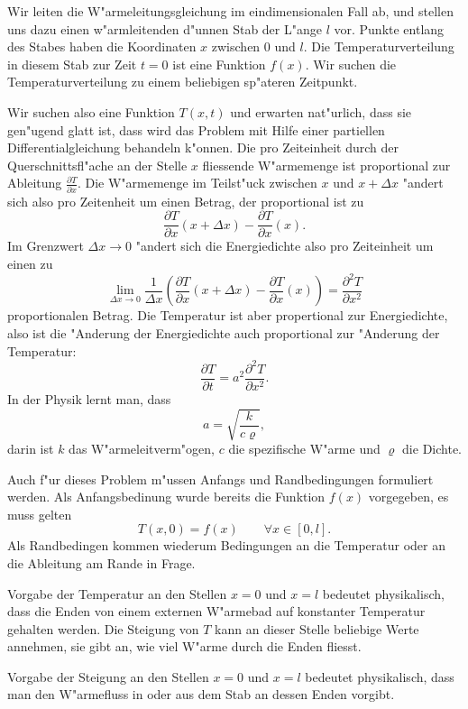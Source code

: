 Wir leiten die W"armeleitungsgleichung im eindimensionalen Fall ab, und stellen
uns dazu einen w"armleitenden d"unnen Stab der L"ange $l$ vor. Punkte
entlang des Stabes haben die Koordinaten $x$ zwischen $0$ und $l$.
Die Temperaturverteilung in diesem Stab zur Zeit $t=0$ ist eine Funktion
$f(x)$. Wir suchen die Temperaturverteilung zu einem beliebigen sp"ateren Zeitpunkt.

Wir suchen also eine Funktion $T(x,t)$ und erwarten nat"urlich, dass sie
gen"ugend glatt ist, dass wird das Problem mit Hilfe einer partiellen
Differentialgleichung behandeln k"onnen. Die pro Zeiteinheit
durch der Querschnittsfl"ache an der Stelle $x$ fliessende W"armemenge ist
proportional zur Ableitung $\frac{\partial T}{\partial x}$.
Die W"armemenge im Teilst"uck zwischen $x$ und $x+\Delta x$ "andert sich also
pro Zeitenheit um einen Betrag, der proportional ist zu
\[
\frac{\partial T}{\partial x}(x+\Delta x)-\frac{\partial T}{\partial x}(x).
\]
Im Grenzwert $\Delta x\to 0$
"andert sich die Energiedichte also pro Zeiteinheit um einen zu
\[
\lim_{\Delta x\to 0}\frac1{\Delta x}\left(\frac{\partial T}{\partial x}(x+\Delta x)-\frac{\partial T}{\partial x}(x)\right)
=\frac{\partial^2T}{\partial x^2}
\]
proportionalen Betrag.
Die Temperatur ist aber propertional zur Energiedichte, also ist die "Anderung
der Energiedichte auch proportional zur "Anderung der Temperatur:
\[
\frac{\partial T}{\partial t}=a^2\frac{\partial^2T}{\partial x^2}.
\]
In der Physik lernt man, dass
\[
a=\sqrt{\frac{k}{c\varrho}},
\]
darin ist $k$ das W"armeleitverm"ogen, $c$ die spezifische W"arme
und $\varrho$ die Dichte.

Auch f"ur dieses Problem m"ussen Anfangs und Randbedingungen formuliert werden.
Als Anfangsbedinung wurde bereits die Funktion $f(x)$ vorgegeben, es muss
gelten
\[
T(x,0)=f(x)\qquad \forall x\in[0,l].
\]
Als Randbedingen kommen wiederum Bedingungen an die Temperatur oder an die
Ableitung am Rande in Frage.

Vorgabe der Temperatur an den Stellen $x=0$ und $x=l$ bedeutet physikalisch, dass
die Enden von einem externen W"armebad auf konstanter Temperatur gehalten
werden. Die Steigung von $T$ kann an dieser Stelle beliebige Werte annehmen,
sie gibt an, wie viel W"arme durch die Enden fliesst.

Vorgabe der Steigung an den Stellen $x=0$ und $x=l$ bedeutet physikalisch,
dass man den W"armefluss in oder aus dem Stab an dessen Enden vorgibt.

